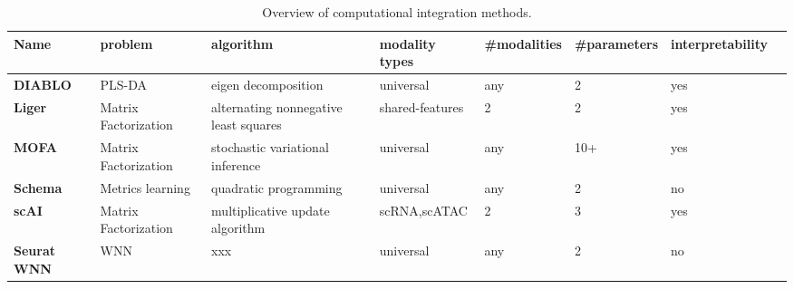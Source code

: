 \begin{table}[!ht]
    \tiny
	\centering
	\begin{tabular}{llllllll}
		\toprule
	 \bfseries	Name & problem &algorithm & modality types & \#modalities & \#parameters & interpretability \\
		\midrule
     \bfseries    DIABLO &PLS-DA& eigen decomposition & universal & any & 2 & yes \\
      \bfseries   Liger &Matrix Factorization&alternating nonnegative least squares & shared-features& 2 & 2 & yes \\
       \bfseries  MOFA   &Matrix Factorization& stochastic variational inference & universal & any & 10+ & yes \\
      \bfseries   Schema &Metrics learning& quadratic programming  & universal & any & 2 & no\\
      \bfseries   scAI &Matrix Factorization& multiplicative update algorithm & scRNA,scATAC & 2 & 3 & yes &\\
      \bfseries   Seurat WNN  & WNN & xxx & universal & any & 2 & no &\\
		\bottomrule
	\end{tabular}
	\vspace{0.1cm}
	\caption[Overview of computational integration methods]{Overview of computational integration methods.}
	\label{tab:methods_integration_overview}
\end{table}

